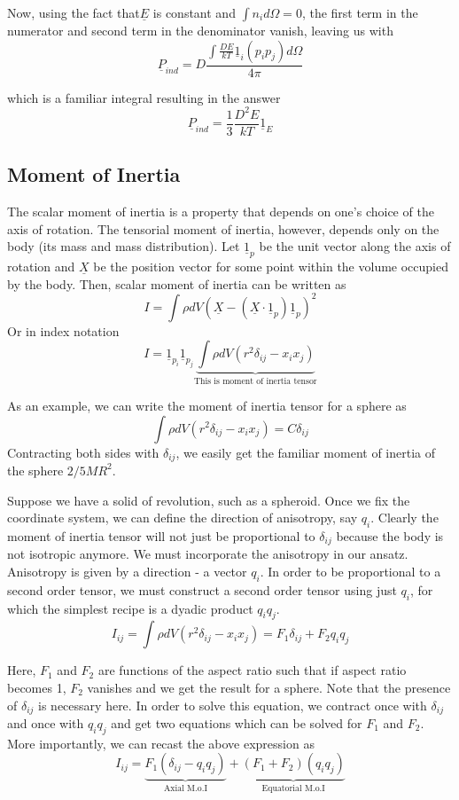 \documentclass[11pt, letterpaper]{article}
\newcommand{\dl}{\delta}
\newcommand{\dij}{\delta_{ij}}
\newcommand{\1}{\bm{1}}
\newcommand{\un}[1]{\underline{#1}}
\begin{document}
Now, using the fact that$\un{E}$ is constant and $\int n_i d\Omega = 0$, the first term in the numerator and second term in the denominator vanish, leaving us with
$$
\un{P}_{ind} = D\frac{\int \frac{D E}{k T} \un{1}_i(p_ip_j)d\Omega}{4\pi}
$$

which is a familiar integral resulting in the answer
$$
\un{P}_{ind} = \frac{1}{3}\frac{D^2 E}{k T} \un{1}_E
$$


\subsection{Moment of Inertia}

The scalar moment of inertia is a property that depends on one's choice of the axis of rotation. The tensorial moment of inertia, however, depends only on the body (its mass and mass distribution). Let $\un{1}_p$ be the unit vector along the axis of rotation and $\un{X}$ be the position vector for some point within the volume occupied by the body. Then, scalar moment of inertia can be written as
$$
I = \int \rho dV (\un{X}-(\un{X}\cdot \un{1}_p)\un{1}_p)^2
$$
Or in index notation
$$
I = \un{1}_{p_i}\un{1}_{p_j} \underbrace{\int \rho dV (r^2 \dl_{ij} - x_i x_j)}_{\text{This is moment of inertia tensor}}
$$

As an example, we can write the moment of inertia tensor for a sphere as
$$
\int \rho dV (r^2 \dl_{ij} - x_i x_j) = C \dl_{ij}
$$
Contracting both sides with $\dl_{ij}$, we easily get the familiar moment of inertia of the sphere $2/5 MR^2$.

Suppose we have a solid of revolution, such as a spheroid. Once we fix the coordinate system, we can define the direction of anisotropy, say $q_i$. Clearly the moment of inertia tensor will not just be proportional to $\dij$ because the body is not isotropic anymore. We must incorporate the anisotropy in our ansatz. Anisotropy is given by a direction - a vector $q_i$. In order to be proportional to a second order tensor, we must construct a second order tensor using just $q_i$, for which the simplest recipe is a dyadic product $q_i q_j$. 
$$
I_{ij} = \int \rho dV (r^2 \dl_{ij} - x_i x_j) = F_1 \dij + F_2 q_i q_j
$$

Here, $F_1$ and $F_2$ are functions of the aspect ratio such that if aspect ratio becomes 1, $F_2$ vanishes and we get the result for a sphere. Note that the presence of $\dij$ is necessary here. In order to solve this equation, we contract once with $\dij$ and once with $q_iq_j$ and get two equations which can be solved for $F_1$ and $F_2$. More importantly, we can recast the above expression as
$$
I_{ij}= \underbrace{F_1(\dij - q_iq_j)}_{\text{Axial M.o.I}}+\underbrace{(F_1 + F_2)(q_iq_j)}_{\text{Equatorial M.o.I}}
$$
\end{document}
